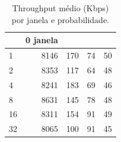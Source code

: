 \begin{table}
\caption{Throughput médio (Kbps) por janela e probabilidade.}
\label{tab:throughput}
\begin{tabular}{lrrrr}
\toprule
 & 0%
janela &  &  &  &  \\
\midrule
1 & 8146 & 170 & 74 & 50 \\
2 & 8353 & 117 & 64 & 48 \\
4 & 8241 & 183 & 69 & 46 \\
8 & 8631 & 145 & 78 & 48 \\
16 & 8311 & 154 & 91 & 49 \\
32 & 8065 & 100 & 91 & 45 \\
\bottomrule
\end{tabular}
\end{table}
